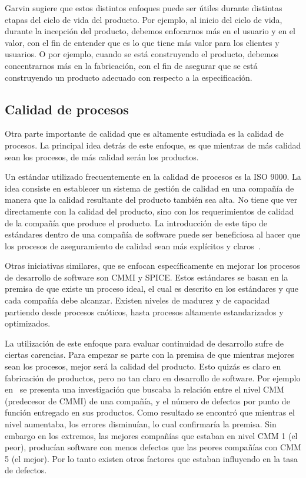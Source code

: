 Garvin sugiere que estos distintos enfoques puede ser útiles durante distintas
etapas del ciclo de vida del producto. Por ejemplo, al inicio del ciclo de 
vida, durante la incepción del producto, debemos enfocarnos más en el usuario
y en el valor, con el fin de entender que es lo que tiene más valor para
los clientes y usuarios. O por ejemplo, cuando se está construyendo el producto,
debemos concentrarnos más en la fabricación, con el fin de asegurar que se está
construyendo un producto adecuado con respecto a la especificación.

\subsection{Calidad de procesos}
Otra parte importante de calidad que es altamente estudiada es la calidad de 
procesos. La principal idea detrás de este enfoque, es que mientras de más
calidad sean los procesos, de más calidad serán los productos.

Un estándar utilizado frecuentemente en la calidad de procesos es la ISO 9000. 
La idea consiste en establecer un sistema de gestión de calidad en una compañía de
manera que la calidad resultante del producto también sea alta. No tiene que ver
directamente con la calidad del producto, sino con los requerimientos de calidad
de la compañía que produce el producto. 
La introducción de este tipo de estándares dentro de una compañía de software
puede ser beneficiosa al hacer que los procesos de aseguramiento de calidad sean
más explícitos y claros~\cite{Wagner:2013}.

Otras iniciativas similares, que se enfocan específicamente en mejorar los
procesos de desarrollo de software son CMMI y SPICE.
Estos estándares se basan en la premisa de que existe un proceso ideal, 
el cual es descrito en los estándares y que cada compañía debe alcanzar.
Existen niveles de madurez y de capacidad partiendo desde procesos caóticos,
hasta procesos altamente estandarizados y optimizados.

La utilización de este enfoque para evaluar continuidad de desarrollo sufre
de ciertas carencias. Para empezar se parte con la premisa de que mientras
mejores sean los procesos, mejor será la calidad del producto. Esto quizás
es claro en fabricación de productos, pero no tan claro en desarrollo de
software. Por ejemplo en~\cite{Jones:2000:SAB:335582} se presenta una 
investigación que buscaba la relación entre el nivel CMM (predecesor de CMMI) 
de una compañía, y el número de defectos por punto de función entregado en sus productos.
Como resultado se encontró que mientras el nivel aumentaba, los errores disminuían,
lo cual confirmaría la premisa. Sin embargo en los extremos, las mejores
compañías que estaban en nivel CMM 1 (el peor), producían software con menos
defectos que las peores compañías con CMM 5 (el mejor). Por lo tanto
existen otros factores que estaban influyendo en la tasa de defectos.

